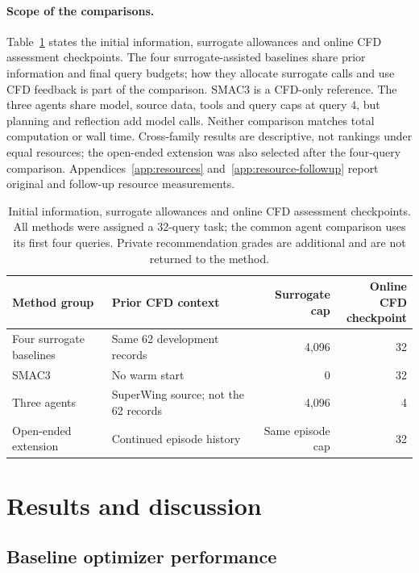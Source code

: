 \documentclass{article} %
\begin{document}
\paragraph{Scope of the comparisons.}
Table~\ref{tab:resource-conditions} states the initial information, surrogate
allowances and online CFD assessment checkpoints.
The four surrogate-assisted baselines share prior information and final query
budgets; how they allocate surrogate calls and use CFD feedback is part of the
comparison. SMAC3 is a CFD-only reference. The three agents share model, source
data, tools and query caps at query 4, but planning and reflection add model
calls. Neither comparison matches total computation or wall time. Cross-family
results are descriptive, not rankings under equal resources; the open-ended
extension was also selected after the four-query comparison.
Appendices~\ref{app:resources} and~\ref{app:resource-followup} report original and follow-up resource measurements.

\begin{table}[htbp]
\centering\scriptsize
\caption{Initial information, surrogate allowances and online CFD assessment
checkpoints. All methods were assigned a 32-query task; the common agent
comparison uses its first four queries. Private recommendation grades are
additional and are not returned to the method.}
\label{tab:resource-conditions}
\setlength{\tabcolsep}{3pt}
\begin{tabular*}{\textwidth}{@{\extracolsep{\fill}}llrr}
\toprule
Method group & Prior CFD context & Surrogate cap & \shortstack{Online CFD\\checkpoint} \\
\midrule
Four surrogate baselines & Same 62 development records & 4{,}096 & 32 \\
SMAC3 & No warm start & 0 & 32 \\
Three agents & SuperWing source; not the 62 records & 4{,}096 & 4 \\
Open-ended extension & Continued episode history & Same episode cap & 32 \\
\bottomrule
\end{tabular*}
\end{table}


\section{Results and discussion}
\label{sec:results}
\label{sec:discussion}


\subsection{Baseline optimizer performance}
\end{document}
